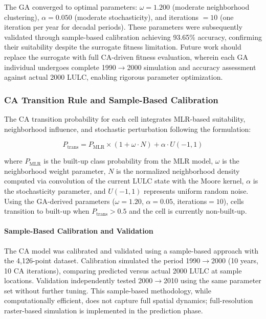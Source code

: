 \documentclass[conference]{IEEEtran}
\begin{document}
The GA converged to optimal parameters: $\omega = 1.200$ (moderate neighborhood clustering), $\alpha = 0.050$ (moderate stochasticity), and iterations $= 10$ (one iteration per year for decadal periods). These parameters were subsequently validated through sample-based calibration achieving 93.65\% accuracy, confirming their suitability despite the surrogate fitness limitation. Future work should replace the surrogate with full CA-driven fitness evaluation, wherein each GA individual undergoes complete 1990$\rightarrow$2000 simulation and accuracy assessment against actual 2000 LULC, enabling rigorous parameter optimization.
\subsubsection{CA Transition Rule and Sample-Based Calibration}

The CA transition probability for each cell integrates MLR-based suitability, neighborhood influence, and stochastic perturbation following the formulation:

\begin{equation}
P_{\text{trans}} = P_{\text{MLR}} \times (1 + \omega \cdot N) + \alpha \cdot U(-1, 1)
\label{eq:ca_transition}
\end{equation}

where $P_{\text{MLR}}$ is the built-up class probability from the MLR model, $\omega$ is the neighborhood weight parameter, $N$ is the normalized neighborhood density computed via convolution of the current LULC state with the Moore kernel, $\alpha$ is the stochasticity parameter, and $U(-1,1)$ represents uniform random noise. Using the GA-derived parameters ($\omega=1.20$, $\alpha=0.05$, iterations$=10$), cells transition to built-up when $P_{\text{trans}} > 0.5$ and the cell is currently non-built-up.

\paragraph{Sample-Based Calibration and Validation}

The CA model was calibrated and validated using a sample-based approach with the 4,126-point dataset. Calibration simulated the period 1990$\rightarrow$2000 (10 years, 10 CA iterations), comparing predicted versus actual 2000 LULC at sample locations. Validation independently tested 2000$\rightarrow$2010 using the same parameter set without further tuning. This sample-based methodology, while computationally efficient, does not capture full spatial dynamics; full-resolution raster-based simulation is implemented in the prediction phase.
\end{document}
